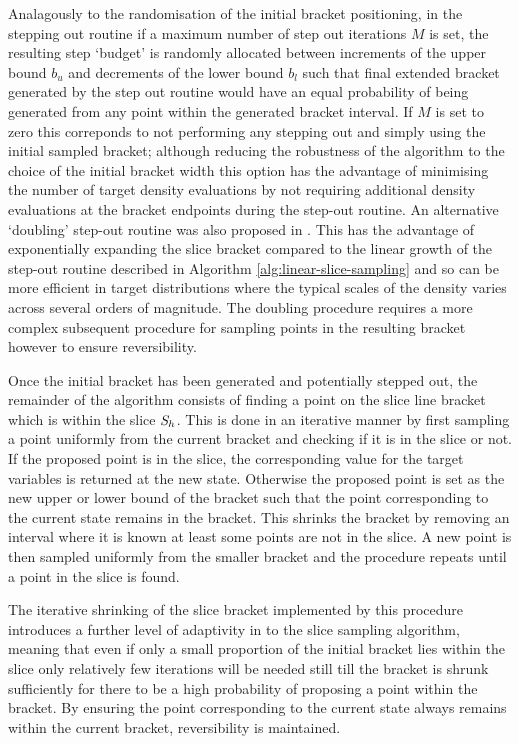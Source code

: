 Analagously to the randomisation of the initial bracket positioning, in the stepping out routine if a maximum number of step out iterations $M$ is set, the resulting step `budget' is randomly allocated between increments of the upper bound $b_u$ and decrements of the lower bound $b_l$ such that final extended bracket generated by the step out routine would have an equal probability of being generated from any point within the generated bracket interval. If $M$ is set to zero this correponds to not performing any stepping out and simply using the initial sampled bracket; although reducing the robustness of the algorithm to the choice of the initial bracket width this option has the advantage of minimising the number of target density evaluations by not requiring additional density evaluations at the bracket endpoints during the step-out routine. An alternative `doubling' step-out routine was also proposed in \citep{neal2003slice}. This has the advantage of exponentially expanding the slice bracket compared to the linear growth of the step-out routine described in Algorithm \ref{alg:linear-slice-sampling} and so can be more efficient in target distributions where the typical scales of the density varies across several orders of magnitude. The doubling procedure requires a more complex subsequent procedure for sampling points in the resulting bracket however to ensure reversibility. 

Once the initial bracket has been generated and potentially stepped out, the remainder of the algorithm consists of finding a point on the slice line bracket which is within the slice $\mathit{S}_h$. This is done in an iterative manner by first sampling a point uniformly from the current bracket and checking if it is in the slice or not. If the proposed point is in the slice, the corresponding value for the target variables is returned at the new state. Otherwise the proposed point is set as the new upper or lower bound of the bracket such that the point corresponding to the current state remains in the bracket. This shrinks the bracket by removing an interval where it is known at least some points are not in the slice. A new point is then sampled uniformly from the smaller bracket and the procedure repeats until a point in the slice is found.

The iterative shrinking of the slice bracket implemented by this procedure introduces a further level of adaptivity in to the slice sampling algorithm, meaning that even if only a small proportion of the initial bracket lies within the slice only relatively few iterations will be needed still till the bracket is shrunk sufficiently for there to be a high probability of proposing a point within the bracket. By ensuring the point corresponding to the current state always remains within the current bracket, reversibility is maintained.

